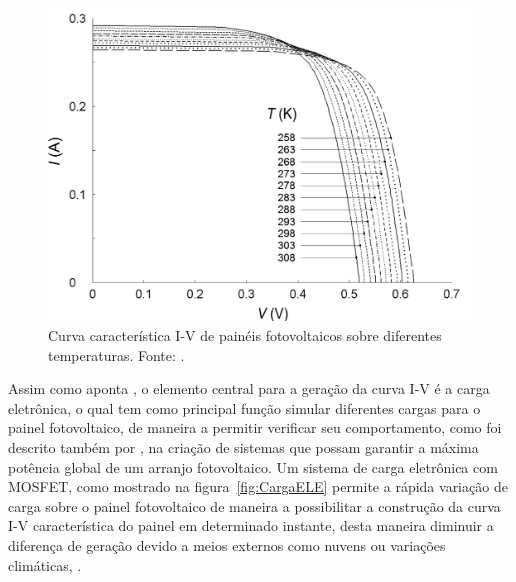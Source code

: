 \FloatBarrier
\begin{figure}[!htbp]
	\centering
	\includegraphics[scale=0.3]{imagens/IxV_Temp}
	\caption{Curva característica I-V de painéis fotovoltaicos sobre diferentes temperaturas. Fonte: . }
	
	\label{fig:IVTemp}
\end{figure}
\FloatBarrier

Assim como aponta , o elemento central para a geração da curva I-V é a carga eletrônica, o qual tem como principal função simular diferentes cargas para o painel fotovoltaico, de maneira a permitir verificar seu comportamento, como foi descrito também por , na criação de sistemas que possam garantir a máxima potência global de um arranjo fotovoltaico. Um sistema de carga eletrônica com MOSFET, como mostrado na figura~\ref{fig:CargaELE} permite a rápida variação de carga sobre o painel fotovoltaico de maneira a possibilitar a construção da curva I-V característica do painel em determinado instante, desta maneira diminuir a diferença de geração devido a meios externos como nuvens ou variações climáticas, \cite{WILLOUGHBY2018171}.%

